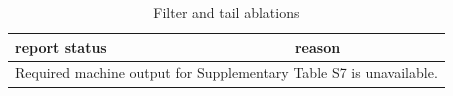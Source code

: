 \begin{table}[htbp]
\centering
\caption{Filter and tail ablations}
\label{tab:s7}
\begin{tabular}{ll}
\hline
report status & reason \\
\hline
\multicolumn{2}{l}{Required machine output for Supplementary Table S7 is unavailable.} \\
\hline
\end{tabular}
\end{table}

